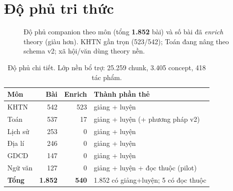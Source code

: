 \documentclass[11pt,a4paper]{article}
\begin{document}
\section{Độ phủ tri thức}
\label{sec:coverage}

\begin{figure}[h]\centering
{}
\caption{Độ phủ companion theo môn (tổng \textbf{1.852} bài) và số bài đã \emph{enrich} theory (giàu hơn).
KHTN gần trọn (523/542); Toán đang nâng theo schema v2; xã hội/văn dùng theory nền.}
\end{figure}

\begin{table}[h]\centering\small\sffamily
\begin{tabular}{lrrl}
\toprule
\textbf{Môn} & \textbf{Bài} & \textbf{Enrich} & \textbf{Thành phần thẻ}\\
\midrule
KHTN     & 542 & 523 & giảng + luyện \\
Toán     & 537 & 17  & giảng + luyện (+ phương pháp v2) \\
Lịch sử  & 253 & 0   & giảng + luyện \\
Địa lí   & 246 & 0   & giảng + luyện \\
GDCD     & 147 & 0   & giảng + luyện \\
Ngữ văn  & 127 & 0   & giảng + luyện + đọc thuộc (pilot) \\
\midrule
\textbf{Tổng} & \textbf{1.852} & \textbf{540} & 1.852 có giảng+luyện; 5 có đọc thuộc \\
\bottomrule
\end{tabular}
\caption{Độ phủ chi tiết. Lớp nền bổ trợ: 25.259 chunk, 3.405 concept, 418 tác phẩm.}
\end{table}
\end{document}
